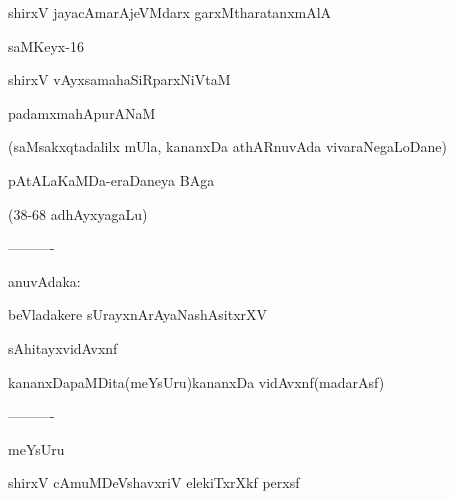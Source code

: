 \documentclass{article}
\begin{document}
\begin{center}
shirxV jayacAmarAjeVMdarx garxMtharatanxmAlA
\end{center}

\begin{center}
saMKeyx-16
\end{center}

\begin{center}
shirxV vAyxsamahaSiRparxNiVtaM
\end{center}

\begin{center}
padamxmahApurANaM
\end{center}

\begin{center}
(saMsakxqtadalilx mUla, kananxDa athARnuvAda vivaraNegaLoDane)
\end{center}

\begin{center}
pAtALaKaMDa-eraDaneya BAga
\end{center}

\begin{center}
(38-68 adhAyxyagaLu)
\end{center}

\begin{center}
----------
\end{center}

\begin{center}
anuvAdaka:
\end{center}

\begin{center}
beVladakere sUrayxnArAyaNashAsitxrXV
\end{center}

\begin{center}
sAhitayxvidAvxnf
\end{center}

\begin{center}
kananxDapaMDita(meYsUru)kananxDa vidAvxnf(madarAsf)
\end{center}

\begin{center}
----------
\end{center}

\begin{center}
meYsUru
\end{center}

\begin{center}
shirxV cAmuMDeVshavxriV elekiTxrXkf perxsf
\end{center}
\end{document}
